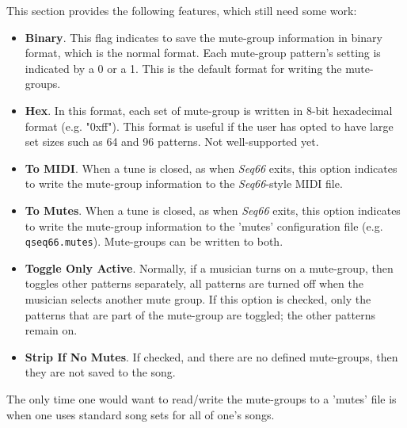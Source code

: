    This section provides the following features, which still need some work:

      \begin{itemize}
         \itempar \textbf{From MIDI}.
            If checked, the mute-groups are read from the MIDI file, if
            present.  These mute-group override the one from an external
            'mutes' file.
         \itempar \textbf{From Mutes}.
            If checked, the mute-groups are read from the specified
            'mutes' file, if present and active.
         \item \textbf{Binary}.
            This flag indicates to save the mute-group information in
            binary format, which is the normal format.
            Each mute-group pattern's setting is indicated by a 0 or a 1.
            This is the default format for writing the mute-groups.
         \item \textbf{Hex}.
            In this format, each set of mute-group is written in 8-bit
            hexadecimal format (e.g. "0xff").  This format is useful if the
            user has opted to have large set sizes such as 64 and 96 patterns.
            Not well-supported yet.
         \item \textbf{To MIDI}.
            When a tune is closed, as when \textsl{Seq66} exits, this option
            indicates to write the mute-group information to the
            \textsl{Seq66}-style MIDI file.
         \item \textbf{To Mutes}.
            When a tune is closed, as when \textsl{Seq66} exits, this option
            indicates to write the mute-group information to the 'mutes'
            configuration file (e.g. \texttt{qseq66.mutes}).
            Mute-groups can be written to both.
         \item \textbf{Toggle Only Active}.
            Normally, if a musician turns on a mute-group, then toggles
            other patterns separately, all patterns are turned off
            when the musician selects another mute group.
            If this option is checked, only the patterns that are
            part of the mute-group are toggled; the other patterns remain
            on.
         \item \textbf{Strip If No Mutes}.
            If checked, and there are no defined mute-groups, then
            they are not saved to the song.
      \end{itemize}

   The only time one would want to read/write the mute-groups to a 'mutes' file
   is when one uses standard song sets for all of one's songs.

